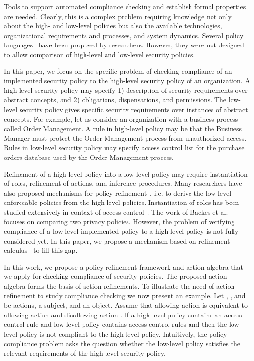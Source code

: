 \documentclass[12pt,journal,letterpaper,onecolumn]{IEEEtran}
\begin{document}
Tools to support automated compliance checking and establish formal
properties are needed. Clearly, this is a complex problem requiring
knowledge not only about the high- and low-level policies but also
the available technologies, organizational requirements and
processes, and system dynamics. Several policy
languages~\cite{Damianou01,Kagal02,Jajodia01,bettini02} have been
proposed by researchers. However, they were not designed to allow
comparison of high-level and low-level security policies.


In this paper, we focus on the specific problem of checking
compliance of an implemented security policy to the high-level
security policy of an organization. A high-level security policy may
specify 1) description of security requirements over abstract
concepts, and 2) obligations, dispensations, and permissions. The
low-level security policy gives specific security requirements over
instances of abstract concepts. For example, let us consider an
organization with a business process called Order Management. A rule
in high-level policy may be that the Business Manager must protect
the Order Management process from unauthorized access. Rules in
low-level security policy may specify access control list for the
purchase orders database used by the Order Management process.


Refinement of a high-level policy into a low-level policy may
require instantiation of roles, refinement of actions, and inference
procedures.  Many researchers have also proposed mechanisms
for policy refinement~\cite{Bandara04,Rubio06,Rochaeli07},
i.e. to derive the low-level enforceable policies from the
high-level policies. Instantiation of roles has been studied extensively in
context of access control~\cite{Ferraiolo}.
The work of Backes et al.~\cite{Backes04} focuses on comparing two privacy policies.
However, the problem of verifying
compliance of a low-level implemented policy to a high-level policy
is not fully considered yet. In this paper, we propose a mechanism
based on refinement calculus~\cite{Back} to fill this gap.

In this work, we propose a policy refinement framework and
action algebra that we apply for checking compliance of security
policies. The proposed action algebra forms the basis of action
 refinements.  To illustrate the need
of action refinement to study compliance checking we now present an
example. Let , , and  be actions,  a subject, and
 an object. Assume that allowing action  is equivalent to
allowing action  and disallowing action . If a high-level
policy contains an access control rule  and low-level
policy contains access control rules  and  then the low level policy is not compliant to the high-level policy.
Intuitively, the
policy compliance problem asks the question whether the low-level
policy satisfies the relevant requirements of the high-level
security policy.
\end{document}
